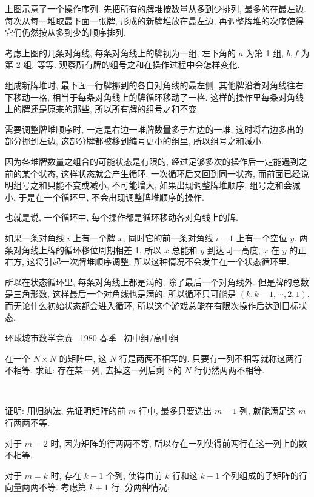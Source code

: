 上图示意了一个操作序列. 先把所有的牌堆按数量从多到少排列, 最多的在最左边. 每次从每一堆取最下面一张牌, 形成的新牌堆放在最左边, 再调整牌堆的次序使得它们仍然按从多到少的顺序排列. 

考虑上图的几条对角线, 每条对角线上的牌视为一组, 左下角的 $ a $ 为第 1 组, $ b, f $ 为第 2 组, 等等. 观察所有牌的组号之和在操作过程中会怎样变化.

组成新牌堆时, 最下面一行牌挪到的各自对角线的最左侧. 其他牌沿着对角线往右下移动一格, 相当于每条对角线上的牌循环移动了一格. 这样的操作里每条对角线上的牌还是原来的那些, 所以所有牌的组号之和不变.

需要调整牌堆顺序时, 一定是右边一堆牌数量多于左边的一堆, 这时将右边多出的部分挪到左边, 这部分牌都被移到编号更小的组里, 所以组号之和减小.

因为各堆牌数量之组合的可能状态是有限的, 经过足够多次的操作后一定能遇到之前的某个状态, 这样状态就会产生循环. 一次循环后又回到同一状态, 而前面已经说明组号之和只能不变或减小, 不可能增大, 如果出现调整牌堆顺序, 组号之和会减小, 于是在一个循环里, 不会出现调整牌堆顺序的操作.

也就是说, 一个循环中, 每个操作都是循环移动各对角线上的牌. 

如果一条对角线 $ i $ 上有一个牌 $ x $, 同时它的前一条对角线 $ i - 1 $ 上有一个空位 $ y $. 两条对角线上牌的循环移位周期相差 1, 所以 $ x $ 总能和 $ y $ 到达同一高度, $ x $ 在 $ y $ 的正右方, 这将引起一次牌堆顺序调整. 所以这种情况不会发生在一个状态循环里.

所以在状态循环里, 每条对角线上都是满的, 除了最后一个对角线外. 但是牌的总数是三角形数, 这样最后一个对角线也是满的. 所以循环只可能是 $ (k,k-1,\cdots,2,1) $. 而无论什么初始状态都会进入循环, 所以这个游戏总能在有限次操作后达到目标状态.


\newpage
\noindent 环球城市数学竞赛~ 1980 春季~ 初中组/高中组

在一个 $ N \times N $ 的矩阵中, 这 $ N $ 行是两两不相等的. 只要有一列不相等就称这两行不相等. 
求证: 存在某一列, 去掉这一列后剩下的 $ N $ 行仍然两两不相等.

~

证明: 用归纳法, 先证明矩阵的前 $ m $ 行中, 最多只要选出 $ m - 1 $ 列, 就能满足这 $ m $ 行两两不等.

对于 $ m = 2 $ 时, 因为矩阵的行两两不等, 所以存在一列使得前两行在这一列上的数不相等. 

对于 $ m = k $ 时, 存在 $ k - 1 $ 个列, 使得由前 $ k $ 行和这 $ k - 1 $ 个列组成的子矩阵的行向量两两不等. 考虑第 $ k + 1 $ 行, 分两种情况:

